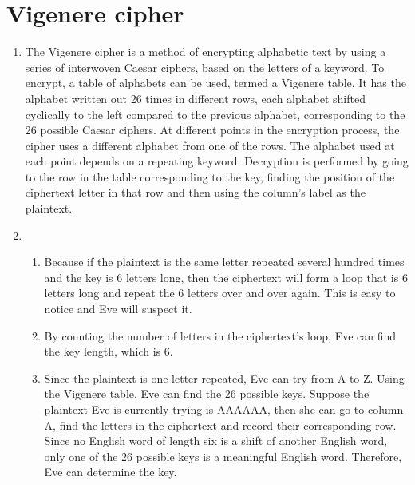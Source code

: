 \documentclass[a4paper]{article}
\begin{document}
\begin{enumerate}
\end{enumerate}

\section{Vigenere cipher}
\begin{enumerate}
\item
The Vigenere cipher is a method of encrypting alphabetic text by using a series of interwoven Caesar ciphers, based on the letters of a keyword. To encrypt, a table of alphabets can be used, termed a Vigenere table. It has the alphabet written out 26 times in different rows, each alphabet shifted cyclically to the left compared to the previous alphabet, corresponding to the 26 possible Caesar ciphers. At different points in the encryption process, the cipher uses a different alphabet from one of the rows. The alphabet used at each point depends on a repeating keyword. Decryption is performed by going to the row in the table corresponding to the key, finding the position of the ciphertext letter in that row and then using the column's label as the plaintext.
\item
\begin{enumerate}
\item
Because if the plaintext is the same letter repeated several hundred times and the key is 6 letters long, then the ciphertext will form a loop that is 6 letters long and repeat the 6 letters over and over again. This is easy to notice and Eve will suspect it.
\item
By counting the number of letters in the ciphertext's loop, Eve can find the key length, which is 6.
\item
Since the plaintext is one letter repeated, Eve can try from A to Z. Using the Vigenere table, Eve can find the 26 possible keys. Suppose the plaintext Eve is currently trying is AAAAAA, then she can go to column A, find the letters in the ciphertext and record their corresponding row. Since no English word of length six is a shift of another English word, only one of the 26 possible keys is a meaningful English word. Therefore, Eve can determine the key.
\end{enumerate}
\end{enumerate}
\end{document}
